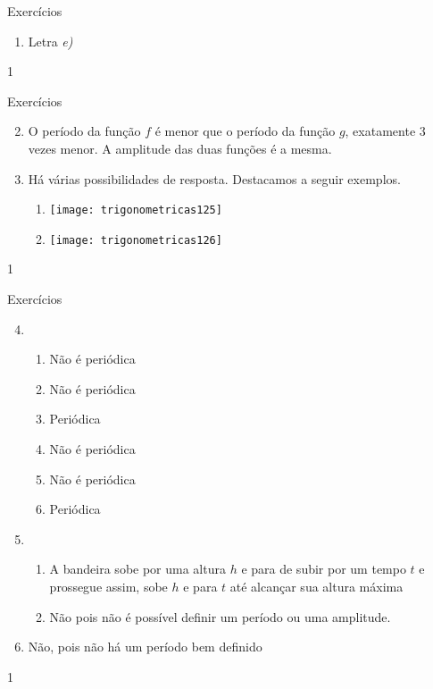 \begin{answer}{Exercícios}
{\exerciselist
\begin{enumerate}
\item Letra \textit{e)}
\end{enumerate}
}{1}
\end{answer}
\clearmargin
\begin{answer}{Exercícios}
{\exerciselist
\begin{enumerate}\setcounter{enumi}{1}
\item O período da função $f$ é menor que o período da função $g$, exatamente $3$ vezes menor. A amplitude das duas funções é a mesma.
\item Há várias possibilidades de resposta. Destacamos a seguir exemplos.
\begin{enumerate}
\item {}
{
\texttt{[image: trigonometricas125]}
}
\item {}
{
\texttt{[image: trigonometricas126]}
}
\end{enumerate}
\end{enumerate}
}{1}
\end{answer}
\clearmargin
\begin{answer}{Exercícios}
{\exerciselist
\begin{enumerate}\setcounter{enumi}{3}
\item 
\begin{enumerate}
\item Não é periódica
\item Não é periódica
\item Periódica
\item Não é periódica
\item Não é periódica
\item Periódica
\end{enumerate}
\item 
\begin{enumerate}
\item A bandeira sobe por uma altura $h$ e para de subir por um tempo $t$ e prossegue assim, sobe $h$ e para $t$ até alcançar sua altura máxima
\item Não pois não é possível definir um período ou uma amplitude.
\end{enumerate}
\item Não, pois não há um período bem definido
\end{enumerate}
}{1}
\end{answer}
